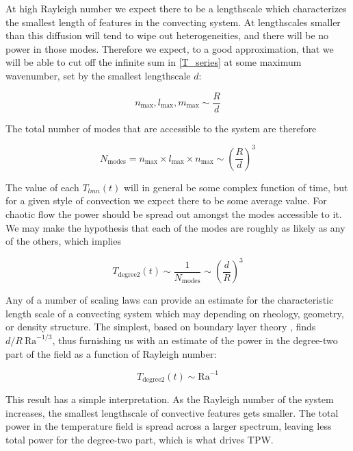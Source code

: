 \documentclass[extra,onecolumn]{gji}
\begin{document}
At high Rayleigh number we expect there to be a lengthscale which characterizes the smallest length of features in the convecting system.  
At lengthscales smaller than this diffusion will tend to wipe out heterogeneities, and there will be no power in those modes.  
Therefore we expect, to a good approximation, that we will be able to cut off the infinite sum in \ref{T_series} at some maximum wavenumber, set by the smallest lengthscale $d$:
 
\begin{equation}
n_{\mathrm{max}}, l_{\mathrm{max}}, m_{\mathrm{max}} \sim \frac{R}{d}
\end{equation}

The total number of modes that are accessible to the system are therefore 

\begin{equation}
N_{\mathrm{modes}} = n_{\mathrm{max}} \times l_{\mathrm{max}} \times n_{\mathrm{max}} \sim \left( \frac{R}{d} \right)^{3}
\end{equation}

The value of each $T_{lmn}(t)$ will in general be some complex function of time, but for a given style of convection we expect there to be some average value.
For chaotic flow the power should be spread out amongst the modes accessible to it.
We may make the hypothesis that each of the modes are roughly as likely as any of the others, which implies

\begin{equation}
T_{\mathrm{degree 2}}(t) \sim \frac{1}{N_{\mathrm{modes}}} \sim \left( \frac{d}{R}\right)^3
\end{equation}

Any of a number of scaling laws can provide an estimate for the characteristic length scale of a convecting system which may depending on rheology, geometry, or density structure.
The simplest, based on boundary layer theory \citep{turcotte1967finite}, finds $d/R ~ \mathrm{Ra}^{-1/3}$, thus furnishing us with an estimate of the power in the degree-two part of the field as a function of Rayleigh number:

\begin{equation}
T_{\mathrm{degree 2}}(t) \sim \mathrm{Ra}^{-1}
\end{equation}

This result has a simple interpretation.  As the Rayleigh number of the system increases, the smallest lengthscale of convective features gets smaller.  The total power in the temperature field is spread across a larger spectrum, leaving less total power for the degree-two part, which is what drives TPW.
\end{document}
